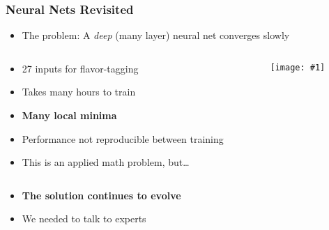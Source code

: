 \documentclass[usenames,dvipsnames]{beamer}
\newcommand{\widegraphic}[1]{\texttt{[image: \#1]}}
\begin{document}
\begin{frame}
  \frametitle{Neural Nets Revisited}
  \begin{itemize}
  \item The problem: A \emph{deep} (many layer) neural net converges slowly
  \end{itemize}
  \begin{columns}
    \begin{column}{0.5\textwidth}
      \begin{itemize}
    \item 27 inputs for flavor-tagging
    \item Takes many hours to train
    \item \textbf{Many local minima}
    \item Performance not reproducible between training
    \item This is an applied math problem, but\ldots
      \end{itemize}
    \end{column}
    \begin{column}{0.5\textwidth}
      \widegraphic{figures/tagging-graphs/complicated-train_gen.pdf}
    \end{column}
  \end{columns}
  \begin{itemize}
  \item \textbf{The solution continues to evolve}
  \item We needed to talk to experts
  \end{itemize}
\end{frame}

\end{document}
